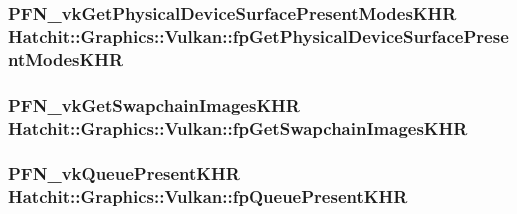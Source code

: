 \subsubsection[{\texorpdfstring{fp\+Get\+Physical\+Device\+Surface\+Present\+Modes\+K\+HR}{fpGetPhysicalDeviceSurfacePresentModesKHR}}]{\setlength{\rightskip}{0pt plus 5cm}P\+F\+N\+\_\+vk\+Get\+Physical\+Device\+Surface\+Present\+Modes\+K\+HR Hatchit\+::\+Graphics\+::\+Vulkan\+::fp\+Get\+Physical\+Device\+Surface\+Present\+Modes\+K\+HR}\hypertarget{namespaceHatchit_1_1Graphics_1_1Vulkan_a2268f416c3238c667b3d5401332f4425}{}\label{namespaceHatchit_1_1Graphics_1_1Vulkan_a2268f416c3238c667b3d5401332f4425}
\subsubsection[{\texorpdfstring{fp\+Get\+Swapchain\+Images\+K\+HR}{fpGetSwapchainImagesKHR}}]{\setlength{\rightskip}{0pt plus 5cm}P\+F\+N\+\_\+vk\+Get\+Swapchain\+Images\+K\+HR Hatchit\+::\+Graphics\+::\+Vulkan\+::fp\+Get\+Swapchain\+Images\+K\+HR}\hypertarget{namespaceHatchit_1_1Graphics_1_1Vulkan_a2465b199c11e905ffb9082b168cf8e85}{}\label{namespaceHatchit_1_1Graphics_1_1Vulkan_a2465b199c11e905ffb9082b168cf8e85}
\subsubsection[{\texorpdfstring{fp\+Queue\+Present\+K\+HR}{fpQueuePresentKHR}}]{\setlength{\rightskip}{0pt plus 5cm}P\+F\+N\+\_\+vk\+Queue\+Present\+K\+HR Hatchit\+::\+Graphics\+::\+Vulkan\+::fp\+Queue\+Present\+K\+HR}\hypertarget{namespaceHatchit_1_1Graphics_1_1Vulkan_a897bf4d08b3e5ad31878a7a5e82254fb}{}\label{namespaceHatchit_1_1Graphics_1_1Vulkan_a897bf4d08b3e5ad31878a7a5e82254fb}
